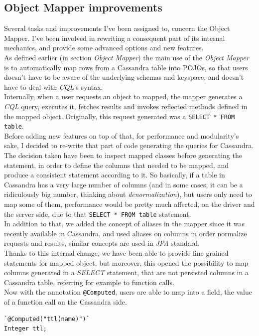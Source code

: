 \documentclass[a4paper]{report}
\begin{document}
\subsection{Object Mapper improvements}
Several tasks and improvements I've been assigned to, concern the Object Mapper. I've been involved in rewriting a consequent part of its internal mechanics, and provide some advanced options and new features.\\
As defined earlier (in section \emph{Object Mapper}) the main use of the \emph{Object Mapper} is to automatically map rows from a Cassandra table into POJOs, so that users doesn't have to be aware of the underlying schemas and keyspace, and doesn't have to deal with \emph{CQL}'s syntax. \\
Internally, when a user requests an object to mapped, the mapper generates a \emph{CQL} query, executes it, fetches results and invokes reflected methods defined in the mapped object. Originally, this request generated was a \verb;SELECT * FROM table;.\\ 
Before adding new features on top of that, for performance and modularity's sake, I decided to re-write that part of code generating the queries for Cassandra. The decision taken have been to inspect mapped classes before generating the statement, in order to define the columns that needed to be mapped, and produce a consistent statement according to it. So basically, if a table in Cassandra has a very large number of columns (and in some cases, it can be a ridiculously big number, thinking about \emph{denormalization}), but users only need to map some of them, performance would be pretty much affected, on the driver and the server side, due to that \verb;SELECT * FROM table; statement.\\
In addition to that, we added the concept of aliases in the mapper since it was recently available in Cassandra, and used aliases on columns in order normalize requests and results, similar concepts are used in \emph{JPA} standard.\\ 
Thanks to this internal change, we have been able to provide fine grained statements for mapped object, but moreover, this opened the possibility to map columns generated in a \emph{SELECT} statement, that are not persisted columns in a Cassandra table, referring for example to function calls.\\
Now with the annotation \verb;@Computed;, users are able to map into a field, the value of a function call on the Cassandra side. 
\begin{lstlisting}[label=om-ex-2, caption=@Computed on mapped fields, style=Java]
`@Computed("ttl(name)")`
Integer ttl;
\end{lstlisting}
\end{document}
